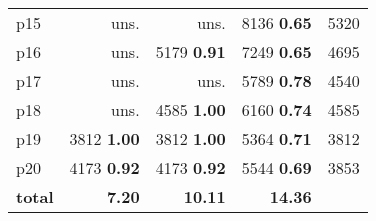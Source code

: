 \begin{tabular}{lrrrr}
\multicolumn{1}{l|}{p15} & uns. & uns. & {\footnotesize 8136} \textbf{0.65} & \multicolumn{1}{|r}{5320}\\
\multicolumn{1}{l|}{p16} & uns. & {\footnotesize 5179} \textbf{0.91} & {\footnotesize 7249} \textbf{0.65} & \multicolumn{1}{|r}{4695}\\
\multicolumn{1}{l|}{p17} & uns. & uns. & {\footnotesize 5789} \textbf{0.78} & \multicolumn{1}{|r}{4540}\\
\multicolumn{1}{l|}{p18} & uns. & {\footnotesize 4585} \textbf{1.00} & {\footnotesize 6160} \textbf{0.74} & \multicolumn{1}{|r}{4585}\\
\multicolumn{1}{l|}{p19} & {\footnotesize 3812} \textbf{1.00} & {\footnotesize 3812} \textbf{1.00} & {\footnotesize 5364} \textbf{0.71} & \multicolumn{1}{|r}{3812}\\
\multicolumn{1}{l|}{p20} & {\footnotesize 4173} \textbf{0.92} & {\footnotesize 4173} \textbf{0.92} & {\footnotesize 5544} \textbf{0.69} & \multicolumn{1}{|r}{3853}\\
\midrule
\textbf{total} & \textbf{7.20} & \textbf{10.11} & \textbf{14.36} & \\
\bottomrule
\end{tabular}

